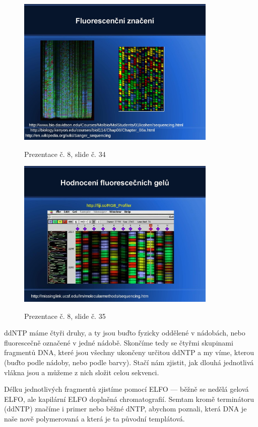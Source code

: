 \documentclass[DIV=8]{scrreprt}
\begin{document}
\begin{figure}
    \caption{Prezentace č. 8, slide č. 34}
    \includegraphics[width=0.85\textwidth]{slides-8/slide-34.jpg}
    \centering
    \label{slides-8-slide-34}
\end{figure}
\begin{figure}
    \caption{Prezentace č. 8, slide č. 35}
    \includegraphics[width=0.85\textwidth]{slides-8/slide-35.jpg}
    \centering
    \label{slides-8-slide-35}
\end{figure}

ddNTP máme čtyři druhy, a ty jsou buďto fyzicky oddělené v nádobách, nebo fluorescečně označené v jedné nádobě. Skončíme tedy se čtyřmi skupinami fragmentů DNA, které jsou všechny ukončeny určitou ddNTP a my víme, kterou (buďto podle nádoby, nebo podle barvy). Stačí nám zjistit, jak dlouhá jednotlivá vlákna jsou a můžeme z nich složit celou sekvenci.

Délku jednotlivých fragmentů zjistíme pomocí ELFO --- běžně se nedělá gelová ELFO, ale kapilární ELFO doplněná chromatografií. Semtam kromě terminátoru (ddNTP) značíme i primer nebo běžné dNTP, abychom poznali, která DNA je naše nově polymerovaná a která je ta původní templátová.
\end{document}
